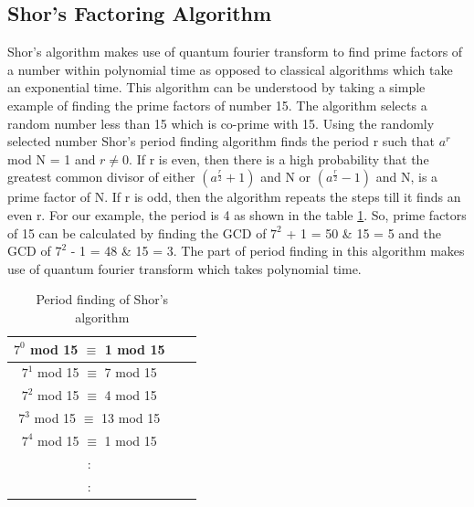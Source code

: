\documentclass[english,a4paper,11pt,oneside,onecolumn]{book}
\begin{document}
\subsection{Shor's Factoring Algorithm}
\label{sec:shorAlgo}
Shor's algorithm makes use of quantum fourier transform to find prime factors of a number within polynomial time as opposed to classical algorithms which take an exponential time. This algorithm can be understood by taking a simple example of finding the prime factors of number 15. The algorithm selects a random number less than 15 which is co-prime with 15. Using the randomly selected number Shor's period finding algorithm finds the period r such that \(a^r\) mod N = 1 and \(r \neq 0\). If r is even, then there is a high probability that the greatest common divisor of either \(\left(a^\frac{r}{2} + 1\right)\) and N or \(\left(a^\frac{r}{2} - 1\right)\) and N, is a prime factor of N. If r is odd, then the algorithm repeats the steps till it finds an even r. For our example, the period is 4 as shown in the table \ref{tab:shorPeriodFinding}. So, prime factors of 15 can be calculated by finding the GCD of \(7^2\) + 1 = 50 \& 15 = 5 and the GCD of \(7^2\) - 1 = 48 \& 15 = 3. The part of period finding in this algorithm makes use of quantum fourier transform which takes polynomial time.

\begin{table}[!h]
\begin{center}
\begin{tabular}{|c|c|c|}
\hline
\(7^0\) mod 15 $\equiv$ 1 mod 15\\
\hline
\(7^1\) mod 15 $\equiv$ 7 mod 15\\
\hline
\(7^2\) mod 15 $\equiv$ 4 mod 15\\
\hline
\(7^3\) mod 15 $\equiv$ 13 mod 15\\
\hline
\(7^4\) mod 15 $\equiv$ 1 mod 15\\
\hline
:\\
:\\
\hline
\end{tabular}
\end{center}
\caption{Period finding of Shor's algorithm} 
\label{tab:shorPeriodFinding}
\end{table}
\end{document}
